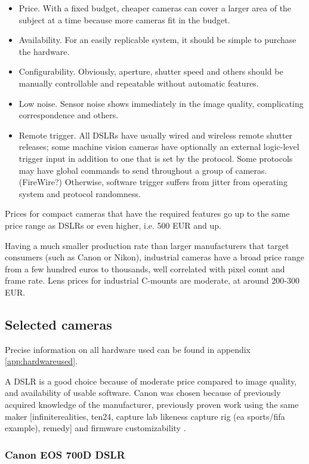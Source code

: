 \begin{itemize}
\item Price. With a fixed budget, cheaper cameras can cover a larger area of the subject at a time because more cameras fit in the budget.
\item Availability. For an easily replicable system, it should be simple to purchase the hardware.
\item Configurability. Obviously, aperture, shutter speed and others should be manually controllable and repeatable without automatic features.
\item Low noise. Sensor noise shows immediately in the image quality, complicating correspondence and others.
\item Remote trigger. All DSLRs have usually wired and wireless remote shutter releases; some machine vision cameras have optionally an external logic-level trigger input in addition to one that is set by the protocol. Some protocols may have global commands to send throughout a group of cameras. (FireWire?) Otherwise, software trigger suffers from jitter from operating system and protocol randomness.
\end{itemize}

Prices for compact cameras that have the required features go up to the same price range as DSLRs or even higher, i.e. 500 EUR and up.

Having a much smaller production rate than larger manufacturers that target consumers (such as Canon or Nikon), industrial cameras have a broad price range from a few hundred euros to thousands, well correlated with pixel count and frame rate.
Lens prices for industrial C-mounts are moderate, at around 200-300 EUR.


\subsection{Selected cameras} %

Precise information on all hardware used can be found in appendix \ref{app:hardwareused}.

A DSLR is a good choice because of moderate price compared to image quality, and availability of usable software.
Canon was chosen because of previously acquired knowledge of the manufacturer, previously proven work using the same maker [infiniterealities, ten24, capture lab likeness capture rig (ea sports/fifa example), remedy] and firmware customizability \cite{magiclantern}. %

\subsubsection{Canon EOS 700D DSLR}

